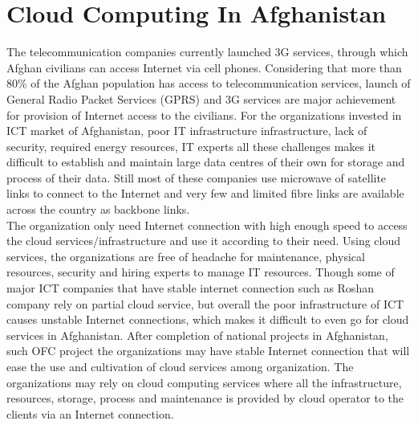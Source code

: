\section{Cloud Computing In Afghanistan}

The telecommunication companies currently launched 3G services, through which Afghan civilians can access Internet via cell phones. Considering that more than 80\% of the Afghan population has access to telecommunication services, launch of General Radio Packet Services (GPRS) and 3G services are major achievement for provision of Internet access to the civilians. For the organizations invested in ICT market of Afghanistan, poor IT infrastructure infrastructure, lack of security, required energy resources, IT experts all these challenges makes it difficult to establish and  maintain large data centres of their own for storage and process of their data. Still most of these companies use microwave of satellite links to connect to the Internet and very few and limited fibre links are available across the country as backbone links.\\

 The organization only need Internet connection with high enough speed to access the cloud services/infrastructure and use it according to their need. Using cloud services, the organizations are free of headache for maintenance, physical resources, security and hiring experts to manage IT resources. Though some of major ICT companies that have stable internet connection such as Roshan company rely on partial cloud service, but overall the poor infrastructure of ICT causes unstable Internet connections, which makes it difficult to even go for cloud services in Afghanistan. After completion of national projects in Afghanistan, such OFC‌ project  the organizations may have stable Internet connection that will ease the use and cultivation of cloud services among organization. The organizations may rely on cloud computing services where all the infrastructure, resources, storage, process and maintenance is provided by cloud operator to the clients via an Internet connection. \\
 
   
    
 


